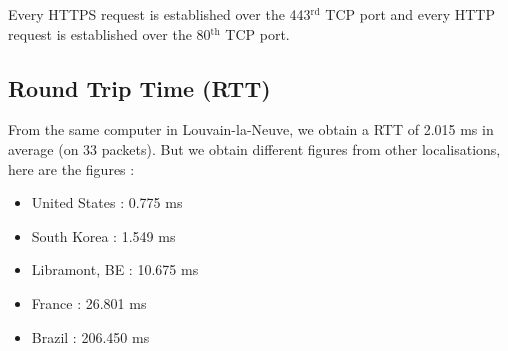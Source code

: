 \documentclass{article}
\begin{document}
Every HTTPS request is established over the 443$^{\text{rd}}$ TCP port and every HTTP request is established over the 80$^{\text{th}}$ TCP port.




\subsection{Round Trip Time (RTT)}
\label{sub:rtt}

From the same computer in Louvain-la-Neuve, we obtain a RTT of 2.015 ms in average (on 33 packets). But we obtain different figures from other localisations, here are the figures : 
\begin{itemize}
    \itemsep-0.1em 
    \item United States :  0.775 ms
    \item South Korea : 1.549 ms
    \item Libramont, BE : 10.675 ms
    \item France : 26.801 ms
    \item Brazil : 206.450 ms
\end{itemize}


\end{document}
